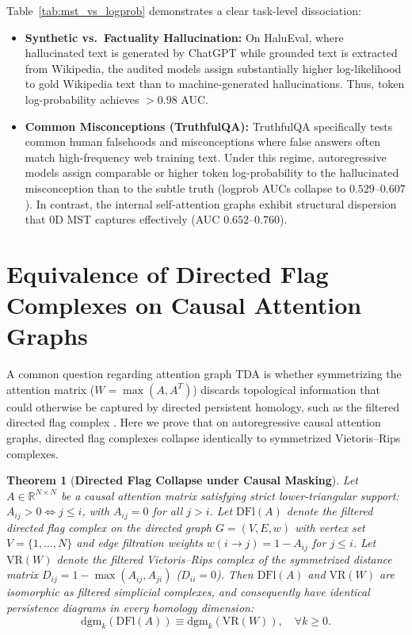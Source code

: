 \documentclass{article}
\newtheorem{theorem}{Theorem}
\begin{document}
Table~\ref{tab:mst_vs_logprob} demonstrates a clear task-level dissociation:
\begin{itemize}
    \item \textbf{Synthetic vs.\ Factuality Hallucination:} On HaluEval, where hallucinated text is generated by ChatGPT while grounded text is extracted from Wikipedia, the audited models assign substantially higher log-likelihood to gold Wikipedia text than to machine-generated hallucinations. Thus, token log-probability achieves $>0.98$ AUC.
    \item \textbf{Common Misconceptions (TruthfulQA):} TruthfulQA specifically tests common human falsehoods and misconceptions where false answers often match high-frequency web training text. Under this regime, autoregressive models assign comparable or higher token log-probability to the hallucinated misconception than to the subtle truth (logprob AUCs collapse to $0.529$--$0.607$). In contrast, the internal self-attention graphs exhibit structural dispersion that $0$D MST captures effectively (AUC $0.652$--$0.760$).
\end{itemize}


\section{Equivalence of Directed Flag Complexes on Causal Attention Graphs}
\label{app:directed_collapse}

A common question regarding attention graph TDA is whether symmetrizing the attention matrix ($W = \max(A, A^T)$) discards topological information that could otherwise be captured by directed persistent homology, such as the filtered directed flag complex \citep{flagser2020}. Here we prove that on autoregressive causal attention graphs, directed flag complexes collapse identically to symmetrized Vietoris--Rips complexes.

\begin{theorem}[\textbf{Directed Flag Collapse under Causal Masking}]
\label{thm:directed_collapse}
Let $A \in \mathbb{R}^{N \times N}$ be a causal attention matrix satisfying strict lower-triangular support: $A_{ij} > 0 \iff j \le i$, with $A_{ij} = 0$ for all $j > i$. Let $\mathrm{DFl}(A)$ denote the filtered directed flag complex on the directed graph $G = (V, E, w)$ with vertex set $V = \{1, \dots, N\}$ and edge filtration weights $w(i \to j) = 1 - A_{ij}$ for $j \le i$. Let $\mathrm{VR}(W)$ denote the filtered Vietoris--Rips complex of the symmetrized distance matrix $D_{ij} = 1 - \max(A_{ij}, A_{ji})$ ($D_{ii} = 0$). Then $\mathrm{DFl}(A)$ and $\mathrm{VR}(W)$ are isomorphic as filtered simplicial complexes, and consequently have identical persistence diagrams in every homology dimension:
\begin{equation}
\mathrm{dgm}_k(\mathrm{DFl}(A)) \equiv \mathrm{dgm}_k(\mathrm{VR}(W)), \quad \forall k \ge 0.
\end{equation}
\end{theorem}
\end{document}
